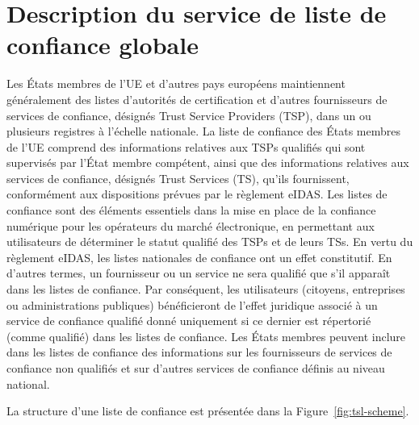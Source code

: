 \documentclass{tnreport}
\begin{document}
\section{Description du service de liste de confiance globale}

Les États membres de l'UE et d'autres pays européens maintiennent généralement des listes d'autorités de certification et d'autres fournisseurs de services de confiance, désignés Trust Service Providers (TSP), dans un ou plusieurs registres à l'échelle nationale.
La liste de confiance des États membres de l'UE comprend des informations relatives aux TSPs qualifiés qui sont supervisés par l'État membre compétent, ainsi que des informations relatives aux services de confiance, désignés Trust Services (TS), qu'ils fournissent, conformément aux dispositions prévues par le règlement eIDAS.
Les listes de confiance sont des éléments essentiels dans la mise en place de la confiance numérique pour les opérateurs du marché électronique, en permettant aux utilisateurs de déterminer le statut qualifié des TSPs et de leurs TSs. En vertu du règlement eIDAS, les listes nationales de confiance ont un effet constitutif.
En d'autres termes, un fournisseur ou un service ne sera qualifié que s'il apparaît dans les listes de confiance. Par conséquent, les utilisateurs (citoyens, entreprises ou administrations publiques) bénéficieront de l'effet juridique associé à un service de confiance qualifié donné uniquement si ce dernier est répertorié (comme qualifié) dans les listes de confiance.	
Les États membres peuvent inclure dans les listes de confiance des informations sur les fournisseurs de services de confiance non qualifiés et sur d'autres services de confiance définis au niveau national.

La structure d'une liste de confiance est présentée dans la Figure~\ref{fig:tsl-scheme}.
\end{document}
